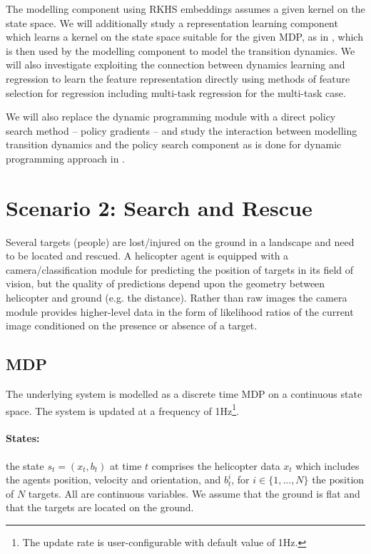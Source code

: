 \documentclass{article}
\begin{document}
The modelling component using RKHS embeddings assumes a given kernel on the state space. We will additionally study a representation learning component which learns a kernel on the state space suitable for the given MDP, as in \cite{LeverFastSSLKernels,LeverKernelsForControl}, which is then used by the modelling component to model the transition dynamics. We will also investigate exploiting the connection between dynamics learning and regression \cite{GrunewalderEmbeddingsRegression} to learn the feature representation directly using methods of feature selection for regression including multi-task regression for the multi-task case.

We will also replace the dynamic programming module with a direct policy search method -- policy gradients -- and study the interaction between modelling transition dynamics and the policy search component as is done for dynamic programming approach in \cite{GrunewalderEmbeddingsMDPs}.


\newpage
\section{Scenario 2: Search and Rescue}
Several targets (people) are lost/injured on the ground in a landscape and need to be located and rescued. A helicopter agent is equipped with a camera/classification module for predicting the position of targets in its field of vision, but the quality of predictions depend upon the geometry between helicopter and ground (e.g. the distance). Rather than raw images the camera module provides higher-level data in the form of likelihood ratios of the current image conditioned on the presence or absence of a target.

\subsection{MDP}

The underlying system is modelled as a discrete time MDP on a continuous state space. The system is updated at a frequency of 1Hz\footnote{The update rate is user-configurable with default value of 1Hz.}. 

\paragraph{States:} the state $s_t=(x_t,b_t)$ at time $t$ comprises the helicopter data $x_t$ which includes the agents position, velocity and orientation, and $b^i_{t}$, for $i\in\{1,...,N\}$ the position of $N$ targets. All are continuous variables. We assume that the ground is flat and that the targets are located on the ground.
\end{document}
